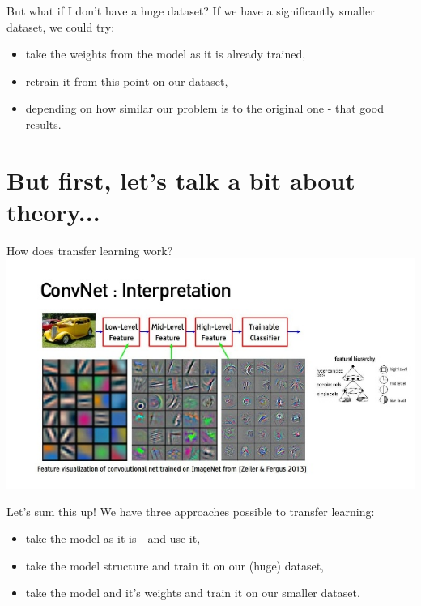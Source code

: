 \documentclass[aspectratio=1610,english]{beamer} %
\begin{document}
 	\begin{frame}{But what if I don't have a huge dataset?}
 		If we have a significantly smaller dataset, we could try:
 		\begin{itemize}
		 	\item take the weights from the model as it is already trained,
		 	\item retrain it from this point on our dataset,
		 	\item depending on how similar our problem is to the original one - that good results.
		 \end{itemize}
	\end{frame}

\section{But first, let's talk a bit about theory...}
  	\begin{frame}{How does transfer learning work?}
			 \includegraphics[scale=0.6]{images/interpr}
	 \end{frame}
  	\begin{frame}{Let's sum this up!}
		We have three approaches possible to transfer learning:
		 \begin{itemize}
		 	\item take the model as it is - and use it,
		 	\item take the model structure and train it on our (huge) dataset,
		 	\item take the model and it's weights and train it on our smaller dataset.
		 \end{itemize}
	\end{frame}
\end{document}

